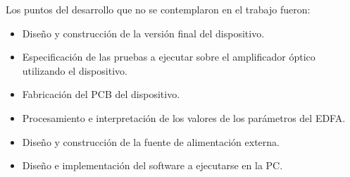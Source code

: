 Los puntos del desarrollo que no se contemplaron en el trabajo fueron:

\begin{itemize}
\item Diseño y construcción de la versión final del dispositivo.
\item Especificación de las pruebas a ejecutar sobre el amplificador óptico utilizando el dispositivo.
\item Fabricación del PCB del dispositivo.
\item Procesamiento e interpretación de los valores de los parámetros del EDFA.
\item Diseño y construcción de la fuente de alimentación externa.
\item Diseño e implementación del software a ejecutarse en la PC.
\end{itemize}


